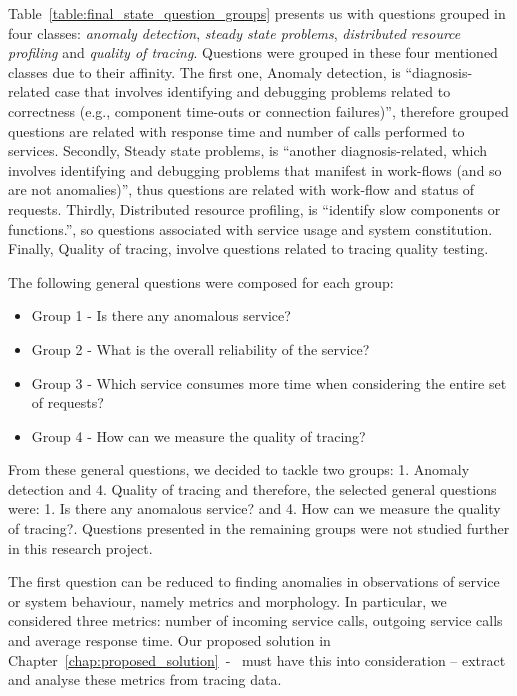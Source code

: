 Table~\ref{table:final_state_question_groups} presents us with questions grouped in four classes: \emph{anomaly detection}, \emph{steady state problems}, \emph{distributed resource profiling} and \emph{quality of tracing}. Questions were grouped in these four mentioned classes due to their affinity. The first one, Anomaly detection, is ``diagnosis-related case that involves identifying and debugging problems related to correctness (e.g., component time-outs or connection failures)'', therefore grouped questions are related with response time and number of calls performed to services. Secondly, Steady state problems, is ``another diagnosis-related, which involves identifying
and debugging problems that manifest in work-flows (and so are not anomalies)'', thus questions are related with work-flow and status of requests. Thirdly, Distributed resource profiling, is ``identify slow components or functions.'', so questions associated with service usage and system constitution. Finally, Quality of tracing, involve questions related to tracing quality testing.

The following general questions were composed for each group:

\begin{itemize}
    \item Group 1 - Is there any anomalous service?
    \item Group 2 - What is the overall reliability of the service?
    \item Group 3 - Which service consumes more time when considering the entire set of requests?
    \item Group 4 - How can we measure the quality of tracing?
\end{itemize}

\newpage

From these general questions, we decided to tackle two groups: 1. Anomaly detection and 4. Quality of tracing and therefore, the selected general questions were: 1. Is there any anomalous service? and 4. How can we measure the quality of tracing?. Questions presented in the remaining groups were not studied further in this research project.

The first question can be reduced to finding anomalies in observations of service or system behaviour, namely metrics and morphology.
In particular, we considered three metrics: number of incoming service calls, outgoing service calls and average response time. Our proposed solution in Chapter~\ref{chap:proposed_solution}~-~ must have this into consideration -- extract and analyse these metrics from tracing data.

